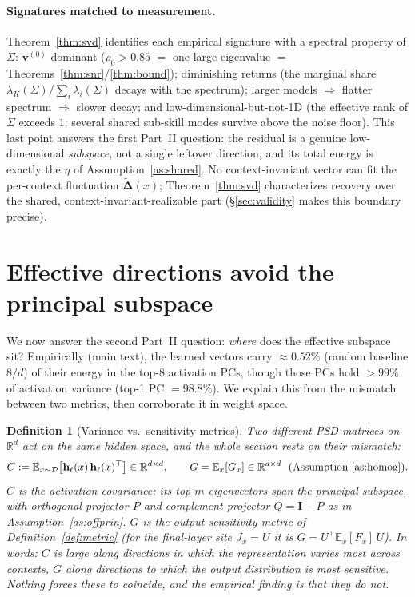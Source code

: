 \documentclass[11pt]{article}
\newtheorem{definition}{Definition}[section]
\newcommand{\R}{\mathbb{R}}
\newcommand{\E}{\mathbb{E}}
\newcommand{\bh}{\mathbf{h}}
\newcommand{\bv}{\mathbf{v}}
\newcommand{\bI}{\mathbf{I}}
\newcommand{\bDelta}{\bm{\Delta}}
\begin{document}
\paragraph{Signatures matched to measurement.}
Theorem~\ref{thm:svd} identifies each empirical signature with a spectral property of $\Sigma$:
$\bv^{(0)}$ dominant ($\rho_0>0.85$ $=$ one large eigenvalue $=$
Theorems~\ref{thm:snr}/\ref{thm:bound}); diminishing returns (the marginal share
$\lambda_K(\Sigma)/\sum_i\lambda_i(\Sigma)$ decays with the spectrum); larger models $\Rightarrow$
flatter spectrum $\Rightarrow$ slower decay; and low-dimensional-but-not-1D (the effective rank of
$\Sigma$ exceeds $1$: several shared sub-skill modes survive above the noise floor). This last point
answers the first Part~II question: the residual is a genuine low-dimensional \emph{subspace}, not a
single leftover direction, and its total energy is exactly the $\eta$ of Assumption~\ref{as:shared}.
No context-invariant vector can fit the per-context fluctuation $\tilde{\bDelta}(x)$;
Theorem~\ref{thm:svd} characterizes recovery over the shared, context-invariant-realizable part
(\S\ref{sec:validity} makes this boundary precise).

\section{Effective directions avoid the principal subspace}\label{sec:complement}
We now answer the second Part~II question: \emph{where} does the effective subspace
sit? Empirically (main text), the learned vectors carry $\approx0.52\%$ (random baseline $8/d$) of
their energy in the top-8 activation PCs, though those PCs hold $>99\%$ of activation variance
(top-1 PC $=98.8\%$). We explain this from the mismatch between two metrics, then corroborate it in
weight space.

\begin{definition}[Variance vs.\ sensitivity metrics]\label{def:CG}
Two different PSD matrices on $\R^{d}$ act on the same hidden space, and the whole section rests on
their mismatch:
\begin{equation*}
C:=\E_{x\sim\mathcal D}\big[\bh_\ell(x)\,\bh_\ell(x)^\top\big]\in\R^{d\times d},
\qquad
G=\E_x[G_x]\in\R^{d\times d}\ \ (\text{Assumption~\ref{as:homog}}).
\end{equation*}
$C$ is the \emph{activation covariance}: its top-$m$ eigenvectors span the \emph{principal
subspace}, with orthogonal projector $P$ and complement projector $Q=\bI-P$ as in
Assumption~\ref{as:offprin}. $G$ is the \emph{output-sensitivity} metric of
Definition~\ref{def:metric} (for the final-layer site $J_x=U$ it is $G=U^\top\E_x[F_x]\,U$). In
words: $C$ is large along directions in which the representation \emph{varies} most across
contexts, $G$ along directions to which the \emph{output distribution} is most sensitive. Nothing
forces these to coincide, and the empirical finding is that they do not.
\end{definition}
\end{document}
